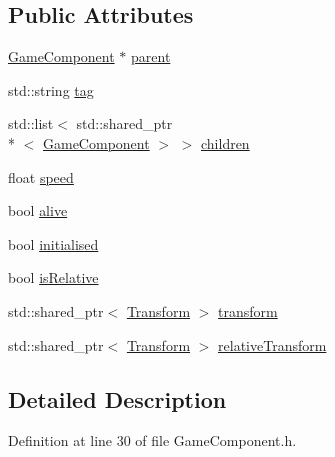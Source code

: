 \subsection*{Public Attributes}
\begin{DoxyCompactItemize}
\item 
\hyperlink{class_b_g_e_1_1_game_component}{Game\-Component} $\ast$ \hyperlink{class_b_g_e_1_1_game_component_acdf201a241a0bc654b1306a627964903}{parent}
\item 
std\-::string \hyperlink{class_b_g_e_1_1_game_component_a7934229e91ebc58e91c6393860df70ee}{tag}
\item 
std\-::list$<$ std\-::shared\-\_\-ptr\\*
$<$ \hyperlink{class_b_g_e_1_1_game_component}{Game\-Component} $>$ $>$ \hyperlink{class_b_g_e_1_1_game_component_a58420cfb1df531c60191cce09f0e6b4c}{children}
\item 
float \hyperlink{class_b_g_e_1_1_game_component_ab7b2e5aacc2e17f5ba824712d6603b5c}{speed}
\item 
bool \hyperlink{class_b_g_e_1_1_game_component_a4970da7fc085e98e6eb30d311798a107}{alive}
\item 
bool \hyperlink{class_b_g_e_1_1_game_component_aeccb76e843b38bee0a6faa6e40eda1ff}{initialised}
\item 
bool \hyperlink{class_b_g_e_1_1_game_component_aa26c64cf49e76e1536419ea3a0229958}{is\-Relative}
\item 
std\-::shared\-\_\-ptr$<$ \hyperlink{class_b_g_e_1_1_transform}{Transform} $>$ \hyperlink{class_b_g_e_1_1_game_component_a085d32f2b004c05bca56f962b5bb7bd8}{transform}
\item 
std\-::shared\-\_\-ptr$<$ \hyperlink{class_b_g_e_1_1_transform}{Transform} $>$ \hyperlink{class_b_g_e_1_1_game_component_a6520e03331270f7502f6506aee231ddb}{relative\-Transform}
\end{DoxyCompactItemize}


\subsection{Detailed Description}


Definition at line 30 of file Game\-Component.\-h.



